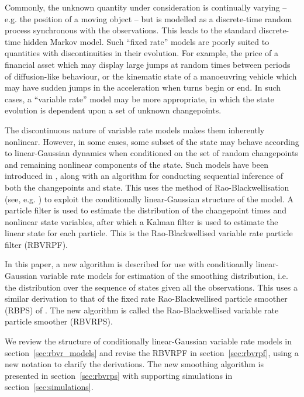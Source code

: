 \documentclass[journal]{IEEEtran}
\begin{document}
Commonly, the unknown quantity under consideration is continually varying -- e.g. the position of a moving object -- but is modelled as a discrete-time random process synchronous with the observations. This leads to the standard discrete-time hidden Markov model. Such ``fixed rate'' models are poorly suited to quantities with discontinuities in their evolution. For example, the price of a financial asset which may display large jumps at random times between periods of diffusion-like behaviour, or the kinematic state of a manoeuvring vehicle which may have sudden jumps in the acceleration when turns begin or end. In such cases, a ``variable rate'' model may be more appropriate, in which the state evolution is dependent upon a set of unknown changepoints.

The discontinuous nature of variable rate models makes them inherently nonlinear. However, in some cases, some subset of the state may behave according to linear-Gaussian dynamics when conditioned on the set of random changepoints and remaining nonlinear components of the state. Such models have been introduced in \cite{Godsill2007a,Christensen2012}, along with an algorithm for conducting sequential inference of both the changepoints and state. This uses the method of Rao-Blackwellisation (see, e.g. \cite{Casella1996,Doucet2000}) to exploit the conditionally linear-Gaussian structure of the model. A particle filter is used to estimate the distribution of the changepoint times and nonlinear state variables, after which a Kalman filter is used to estimate the linear state for each particle. This is the Rao-Blackwellised variable rate particle filter (RBVRPF).

In this paper, a new algorithm is described for use with conditioanlly linear-Gaussian variable rate models for estimation of the smoothing distribution, i.e. the distribution over the sequence of states given all the observations. This uses a similar derivation to that of the fixed rate Rao-Blackwellised particle smoother (RBPS) of \cite{Sarkka2012}. The new algorithm is called the Rao-Blackwellised variable rate particle smoother (RBVRPS).

We review the structure of conditionally linear-Gaussian variable rate models in section~\ref{sec:rbvr_models} and revise the RBVRPF in section~\ref{sec:rbvrpf}, using a new notation to clarify the derivations. The new smoothing algorithm is presented in section~\ref{sec:rbvrps} with supporting simulations in section~\ref{sec:simulations}.
\end{document}
